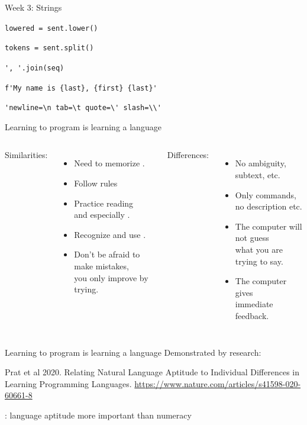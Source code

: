 \documentclass[aspectratio=169,usenames,dvipsnames]{beamer}
\begin{document}
\begin{frame}[fragile]{Week 3: Strings}
    \begin{description}[Formatting]
        \item[Lowercasing] \lstinline{lowered = sent.lower()}
        \item[Splitting] \lstinline{tokens = sent.split()}
        \item[Joining] \lstinline{', '.join(seq)}
        \item[Formatting] \lstinline|f'My name is {last}, {first} {last}'|
        \item[Escaping] \lstinline|'newline=\n tab=\t quote=\' slash=\\'|
    \end{description}
\end{frame}

\begin{frame}{Learning to program is learning a language}
\begin{columns}[T]
Similarities:
\begin{itemize}
	\item Need to memorize .
	\item Follow  rules
	\item Practice reading \\
			and especially .
	\item Recognize and use .
	\item Don't be afraid to make mistakes, \\
		you only improve by trying.
\end{itemize}
\pause Differences:
\pause
\begin{itemize}
	\item No ambiguity, subtext, etc.
	\item Only commands, \\
        no description etc.
	\item The computer will not guess \\
        what you are trying to say.
	\item The computer gives \\
        immediate feedback.
\end{itemize}
\end{columns}
\end{frame}

\begin{frame}{Learning to program is learning a language}
Demonstrated by research:

\vspace{1em}
Prat et al 2020.
Relating Natural Language Aptitude to Individual Differences
in Learning Programming Languages.
\url{https://www.nature.com/articles/s41598-020-60661-8}

\vspace{1em}
    : language aptitude more important than numeracy
\end{frame}
\end{document}
